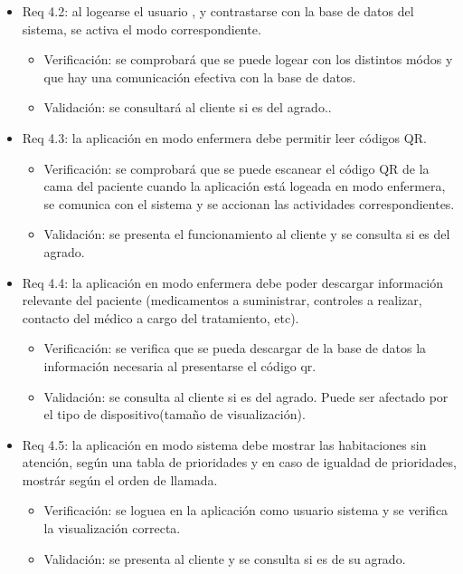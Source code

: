 \documentclass[
11pt, %
]{charter}
\begin{document}
\begin{itemize}
\item Req 4.2: al logearse el usuario , y contrastarse con la base de datos del sistema, se activa el modo correspondiente.
	\begin{itemize}
	\item Verificación: se comprobará que se puede logear con los distintos módos y que hay una comunicación efectiva con la base de datos.
	\item Validación: se consultará al cliente si es del agrado..
	\end{itemize}		

\item Req 4.3: la aplicación en modo enfermera debe permitir leer códigos QR.
	\begin{itemize}
	\item Verificación: se comprobará que se puede escanear el código QR de la cama del paciente cuando la aplicación está logeada en modo enfermera, se comunica con el sistema y se accionan las actividades correspondientes.
	\item Validación:  se presenta el funcionamiento al cliente y se consulta si es del agrado.
	\end{itemize}		

\item Req 4.4: la aplicación en modo enfermera debe poder descargar información relevante del paciente (medicamentos a suministrar, controles a realizar, contacto del médico a cargo del tratamiento, etc).	
	\begin{itemize}
	\item Verificación: se verifica que se pueda descargar de la base de datos la información necesaria al presentarse el código qr.
	\item Validación:  se consulta al cliente si es del agrado. Puede ser afectado por el tipo de dispositivo(tamaño de visualización).
	\end{itemize}		

\item Req 4.5: la aplicación en modo sistema debe mostrar las habitaciones sin atención, según una tabla de prioridades y en caso de igualdad de prioridades, mostrár según el orden de llamada.
	\begin{itemize}
	\item Verificación: se loguea en la aplicación como usuario sistema y se verifica la visualización correcta.
	\item Validación:  se presenta al cliente y se consulta si es de su agrado.
	\end{itemize}		



\end{itemize}
\end{document}
